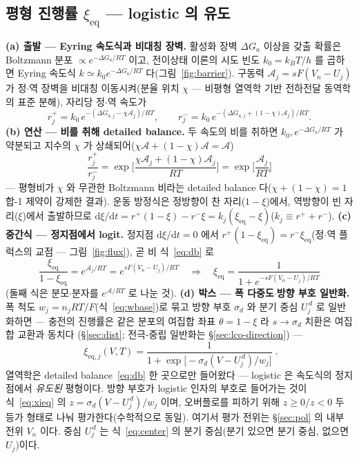 \documentclass[11pt,a4paper]{article}
\newcommand{\dd}{\mathrm{d}}
\newcommand{\eq}{\mathrm{eq}}
\begin{document}
\subsection{평형 진행률 $\xi_\eq$ — logistic 의 유도}
\textbf{(a) 출발 — Eyring 속도식과 비대칭 장벽.} 활성화 장벽 $\Delta G_a$ 이상을 갖출 확률은 Boltzmann 분포
$\propto e^{-\Delta G_a/RT}$ 이고, 전이상태 이론의 시도 빈도 $k_0=k_BT/h$ 를 곱하면 Eyring 속도식
$k\simeq k_0e^{-\Delta G_a/RT}$ 다(그림~\ref{fig:barrier})\cite{eyring1935}. 구동력 $\mathcal A_j=sF(V_n-U_j)$ 가 정$\cdot$역 장벽을
비대칭 이동시켜(분율 위치 $\chi$ — 비평형 열역학 기반 전하전달 동역학의 표준 분해\cite{bazant2013}), 자리당 정$\cdot$역 속도가
\begin{equation}
r_j^+=k_0\,e^{-(\Delta G_{a,j}-\chi\mathcal A_j)/RT},\qquad
r_j^-=k_0\,e^{-(\Delta G_{a,j}+(1-\chi)\mathcal A_j)/RT}.
\label{eq:bv}
\end{equation}
\textbf{(b) 연산 — 비를 취해 detailed balance.} 두 속도의 비를 취하면 $k_0,e^{-\Delta G_a/RT}$ 가 약분되고 지수의
$\chi$ 가 상쇄되어($\chi\mathcal A+(1-\chi)\mathcal A=\mathcal A$)
\begin{equation}
\frac{r_j^+}{r_j^-}=\exp\!\Big[\frac{\chi\mathcal A_j+(1-\chi)\mathcal A_j}{RT}\Big]=\exp\!\Big[\frac{\mathcal A_j}{RT}\Big]
\label{eq:db}
\end{equation}
— 평형비가 $\chi$ 와 무관한 Boltzmann 비라는 detailed balance 다($\chi+(1-\chi)=1$ 합-1 제약이 강제한 결과). 운동
방정식은 정방향이 찬 자리($1-\xi$)에서, 역방향이 빈 자리($\xi$)에서 출발하므로
$\dd\xi/\dd t=r^+(1-\xi)-r^-\xi=k_j(\xi_\eq-\xi)$($k_j\equiv r^++r^-$). \textbf{(c) 중간식 — 정지점에서 logit.}
정지점 $\dd\xi/\dd t=0$ 에서 $r^+(1-\xi_\eq)=r^-\xi_\eq$(정$\cdot$역 플럭스의 교점 — 그림~\ref{fig:flux}), 곧
비 식~\eqref{eq:db} 로
\begin{equation}
\frac{\xi_\eq}{1-\xi_\eq}=e^{\mathcal A_j/RT}=e^{sF(V_n-U_j)/RT}
\quad\Longrightarrow\quad
\xi_\eq=\frac{1}{1+e^{-sF(V_n-U_j)/RT}}
\label{eq:logisticsolve}
\end{equation}
(둘째 식은 분모$\cdot$분자를 $e^{\mathcal A/RT}$ 로 나눈 것). \textbf{(d) 박스 — 폭 다중도$\cdot$방향 부호 일반화.}
폭 척도 $w_j=n_jRT/F$(식~\eqref{eq:wbase})로 묶고 방향 부호 $\sigma_d$ 와 분기 중심 $U_j^{\,d}$ 로 일반화하면
--- 충전의 진행률은 같은 분포의 여집합 좌표 $\theta=1-\xi$ 라 $s\to\sigma_d$ 치환은 여집합 교환과 동치다
(\S\ref{sec:dist}; 전극-중립 일반화는 \S\ref{sec:lco-direction}) ---
\begin{equation}
\boxed{\;\xi_{\eq,j}(V,T)=\frac{1}{1+\exp\!\big[-\sigma_d(V-U_j^{\,d})/w_j\big]}\;.}
\label{eq:xieq}
\end{equation}
열역학은 detailed balance~\eqref{eq:db} 한 곳으로만 들어왔다 — logistic 은 속도식의 정지점에서 \emph{유도된}
평형이다. 방향 부호가 logistic 인자의 부호로 들어가는 것이 식~\eqref{eq:xieq} 의
$z=\sigma_d(V-U_j^{\,d})/w_j$ 이며, 오버플로를 피하기 위해 $z\ge0/z<0$ 두 등가 형태로 나눠 평가한다(수학적으로
동일). 여기서 평가 전위는 \S\ref{sec:pol} 의 내부 전위 $V_n$ 이다. 중심 $U_j^{\,d}$
는 식~\eqref{eq:center} 의 분기 중심(분기 있으면 분기 중심, 없으면 $U_j$)이다.
\end{document}
